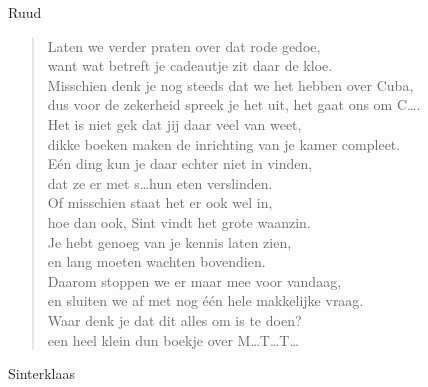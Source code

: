 \documentclass[12pt]{brief}
\begin{document}
\begin{letter}{Ruud}
\begin{verse}
Laten we verder praten over dat rode gedoe,\\
want wat betreft je cadeautje zit daar de kloe.\\
Misschien denk je nog steeds dat we het hebben over Cuba,\\
dus voor de zekerheid spreek je het uit, het gaat ons om C\ldots.\\
Het is niet gek dat jij daar veel van weet,\\
dikke boeken maken de inrichting van je kamer compleet.\\
E\'en ding kun je daar echter niet in vinden,\\
dat ze er met s\ldots hun eten verslinden.\\
Of misschien staat het er ook wel in,\\
hoe dan ook, Sint vindt het grote waanzin.\\[0.5em]

Je hebt genoeg van je kennis laten zien,\\
en lang moeten wachten bovendien.\\
Daarom stoppen we er maar mee voor vandaag,\\
en sluiten we af met nog \'e\'en hele makkelijke vraag.\\[0.5em]

Waar denk je dat dit alles om is te doen?\\
een heel klein dun boekje over M\ldots T\ldots T\ldots\\[2em]

\end{verse}


Sinterklaas


\closing{}

\end{letter}
\end{document}
